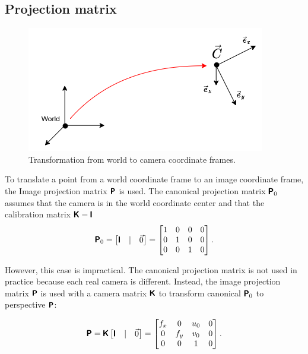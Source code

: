 \subsection{Projection matrix}

\begin{figure}[ht]
    \centering
    \includegraphics[width=.5\textwidth]{graphics/frames.png}
    \caption{Transformation from world to camera coordinate frames.}
    \label{fig:frames}
\end{figure}

To translate a point from a world coordinate frame to an image coordinate frame, the Image projection matrix $\pmb{\mathsf{P}}$ is used. 
The canonical projection matrix $\pmb{\mathsf{P}}_0$ assumes that the camera is in the world coordinate center and that the calibration matrix $\pmb{\mathsf{K}} = \pmb{\mathsf{I}}$
\begin{equation}
\pmb{\mathsf{P}}_0 = \begin{bmatrix} \pmb{\mathsf{I}} & | & \vec{0} \end{bmatrix} = 
    \begin{bmatrix}
    1 & 0 & 0 & 0 \\
    0 & 1 & 0 & 0 \\
    0 & 0 & 1 & 0 \\
    \end{bmatrix}.
\end{equation}

However, this case is impractical. 
The canonical projection matrix is not used in practice because each real camera is different. 
Instead, the image projection matrix $\pmb{\mathsf{P}}$ is used with a camera matrix $\pmb{\mathsf{K}}$ to transform canonical $\pmb{\mathsf{P}}_0$ to perspective $\pmb{\mathsf{P}}$:

\begin{equation}
\pmb{\mathsf{P}} = \pmb{\mathsf{K}} \begin{bmatrix} \pmb{\mathsf{I}} & | & \vec{0} \end{bmatrix} = 
    \begin{bmatrix} 
    f_x & 0 & u_0 & 0 \\
    0 & f_y & v_0 & 0 \\ 
    0 & 0 & 1 & 0 \\
    \end{bmatrix}.
\end{equation}

